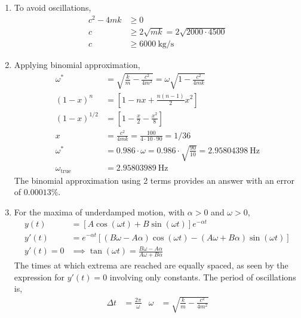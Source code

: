 \begin{enumerate}
    \item To avoid oscillations,
          \begin{align}
              c^{2} - 4mk & \geq 0                                      \\
              c           & \geq 2 \sqrt{mk} = 2 \sqrt{2000 \cdot 4500} \\
              c           & \geq \SI{6000}{\kg\per\s}
          \end{align}

    \item Applying binomial approximation,
          \begin{align}
              \omega^{*}           & = \sqrt{\frac{k}{m} - \frac{c^{2}}{4m^{2}}} = \omega\sqrt{1 - \frac{c^{2}}{4mk}} \\
              (1 - x)^{n}          & =  \left[ 1 - nx + \frac{n(n-1)}{2}x^{2} \right]                                 \\
              (1 - x)^{1/2}        & =  \left[ 1 - \frac{x}{2} - \frac{x^{2}}{8}  \right]                             \\
              x                    & = \frac{c^{2}}{4mk} = \frac{100}{4 \cdot 10 \cdot 90} = 1/36                     \\
              \omega^{*}           & = 0.986 \cdot \omega = 0.986 \cdot \sqrt{\frac{90}{10}} = \SI{2.95804398}{\Hz}   \\
              \omega_{\text{true}} & = \SI{2.95803989}{\Hz}
          \end{align}
          The binomial approximation using 2 terms provides an answer
          with an error of $ 0.00013\% $.

    \item For the maxima of underdamped motion, with $ \alpha > 0 $ and $ \omega > 0 $,
          \begin{align}
              y(t)      & = [A \cos(\omega t) + B\sin(\omega t)]e^{-\alpha t}                                    \\
              y'(t)     & = e^{-\alpha t}[(B\omega - A\alpha)\cos(\omega t) - (A\omega + B\alpha)\sin(\omega t)] \\
              y'(t) = 0 & \implies \tan(\omega t) = \frac{B\omega - A\alpha}{A\omega + B\alpha}
          \end{align}
          The times at which extrema are reached are equally spaced, as seen by the expression for
          $ y'(t) = 0 $ involving only constants. The period of oscillations is,
          \begin{align}
              \Delta t & = \frac{2\pi}{\omega } & \omega & = \sqrt{\frac{k}{m} - \frac{c^{2}}{4m^{2}}}
          \end{align}


\end{enumerate}
